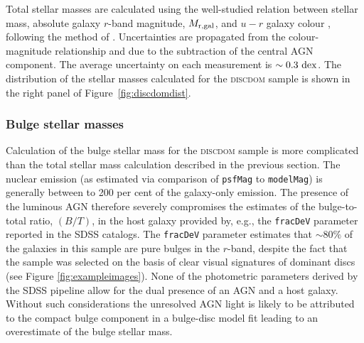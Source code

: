 Total stellar masses are calculated using the well-studied relation between stellar mass, absolute galaxy $r$-band magnitude, $M_{\rm{r, gal}}$, and $u-r$ galaxy colour \citep[corrected for galactic extinction;][]{schlegel98}, following the method of \citet[][see Section \ref{intro}]{Baldry06}. Uncertainties are propagated from the colour-magnitude relationship and due to the subtraction of the central AGN component. The average uncertainty on each measurement is $\sim0.3~\rm{dex}$. The distribution of the stellar masses calculated for the \textsc{discdom} sample is shown in the right panel of Figure~\ref{fig:discdomdist}. 

\subsubsection{Bulge stellar masses}\label{sec:bulgemass}

Calculation of the bulge stellar mass for the \textsc{discdom} sample is more complicated than the total stellar mass calculation described in the previous section. The nuclear emission (as estimated via comparison of {\tt psfMag} to {\tt modelMag}) is generally between { to 200 per cent} of the galaxy-only emission. The presence of the luminous AGN therefore severely compromises the estimates of the bulge-to-total ratio, $(B/T)$, in the host galaxy provided by, e.g., the {\tt fracDeV} parameter reported in the SDSS catalogs. The {\tt fracDeV} parameter estimates that $\sim 80\%$ of the galaxies in this sample are pure \citet{devaucouleurs} bulges in the $r$-band, despite the fact that the sample was selected on the basis of clear visual signatures of dominant discs (see Figure \ref{fig:exampleimages}). None of the photometric parameters derived by the SDSS pipeline allow for the dual presence of an AGN and a host galaxy. Without such considerations the unresolved AGN light is likely to be attributed to the compact bulge component in a bulge-disc model fit \citep{simmons08,koss11} leading to an overestimate of the bulge stellar mass.


